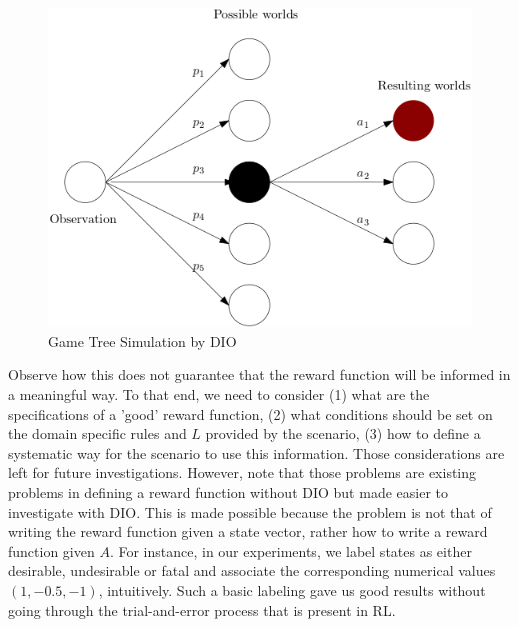 \begin{figure}
  \centering
  \includegraphics[scale=0.55]{figures/scworlds.png}
  \caption{Game Tree Simulation by DIO}
  \label{fig:diosim}
\end{figure}

Observe how this does not guarantee that the reward function will be informed in a meaningful way.
To that end, we need to consider (1) what are the specifications of a 'good' reward function, (2) what conditions should be set 
on the domain specific rules and $L$ provided by the scenario, (3) how to define a systematic way for the scenario to use 
this information. Those considerations are left for future
investigations. However, note that those problems are existing problems in defining a reward function 
without DIO but made easier to investigate with DIO. This is made possible because the problem 
is not that of writing the reward function given a state vector, rather how to write a reward function given 
$A$. For instance, in our experiments, we label states as either desirable, undesirable or fatal and associate 
the corresponding numerical values $(1,-0.5, -1)$, intuitively. Such a basic labeling gave us good results without 
going through the trial-and-error process that is present in RL.  
 

